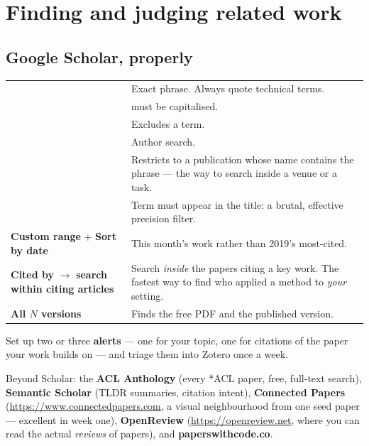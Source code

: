 \documentclass[11pt,a4paper]{article}
\begin{document}
\section{Finding and judging related work}

\subsection{Google Scholar, properly}

\begin{center}
\small
\begin{tabularx}{\textwidth}{L{4.8cm} X}
\toprule
{} &  \\
\midrule
{}
 & Exact phrase. Always quote technical terms. \\
 &  must be capitalised. \\
 & Excludes a term. \\
 & Author search. \\
 & Restricts to a publication whose name contains the
phrase --- the way to search inside a venue or a task. \\
 & Term must appear in the title: a brutal, effective
precision filter. \\
\textbf{Custom range} + \textbf{Sort by date} & This month's work rather than
2019's most-cited. \\
\textbf{Cited by} $\rightarrow$ \textbf{search within citing articles} &
Search \emph{inside} the papers citing a key work. The fastest way to find who
applied a method to \emph{your} setting. \\
\textbf{All $N$ versions} & Finds the free PDF and the published version. \\
\bottomrule
\end{tabularx}
\end{center}

Set up two or three \textbf{alerts} --- one for your topic, one for citations
of the paper your work builds on --- and triage them into Zotero once a week.

Beyond Scholar: the \textbf{ACL Anthology} (every *ACL paper, free, full-text
search), \textbf{Semantic Scholar} (TLDR summaries, citation intent),
\textbf{Connected Papers} (\url{https://www.connectedpapers.com}, a visual
neighbourhood from one seed paper --- excellent in week one),
\textbf{OpenReview} (\url{https://openreview.net}, where you can read the
actual \emph{reviews} of papers), and \textbf{paperswithcode.co}.
\end{document}
